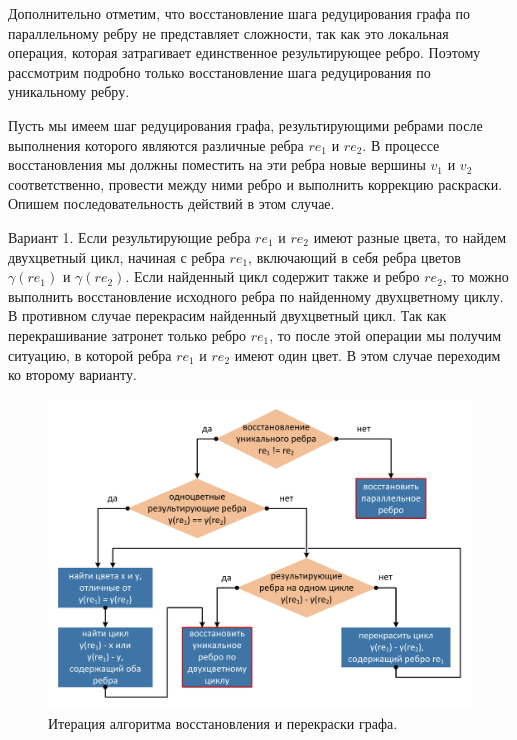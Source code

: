 Дополнительно отметим, что восстановление шага редуцирования графа по параллельному ребру не представляет сложности, так как это локальная операция, которая затрагивает единственное результирующее ребро. Поэтому рассмотрим подробно только восстановление шага редуцирования по уникальному ребру.

Пусть мы имеем шаг редуцирования графа, результирующими ребрами после выполнения которого являются различные ребра $re_1$ и $re_2$.
В процессе восстановления мы должны поместить на эти ребра новые вершины $v_1$ и $v_2$ соответственно, провести между ними ребро и выполнить коррекцию раскраски.
Опишем последовательность действий в этом случае.

Вариант 1. Если результирующие ребра $re_1$ и $re_2$ имеют разные цвета, то найдем двухцветный цикл, начиная с ребра $re_1$, включающий в себя ребра цветов $\gamma(re_1)$ и $\gamma(re_2)$.
Если найденный цикл содержит также и ребро $re_2$, то можно выполнить восстановление исходного ребра по найденному двухцветному циклу.
В противном случае перекрасим найденный двухцветный цикл.
Так как перекрашивание затронет только ребро $re_1$, то после этой операции мы получим ситуацию, в которой ребра $re_1$ и $re_2$ имеют один цвет. В этом случае переходим ко второму варианту.

\begin{figure}[ht]
\centering
\includegraphics[width=1.0\textwidth]{fig/par_edge_col_7-algorithm.pdf}
\singlespacing
{}\caption{Итерация алгоритма восстановления и перекраски графа.}
\label{fig:text_3_edge_coloring_7}
\end{figure}

